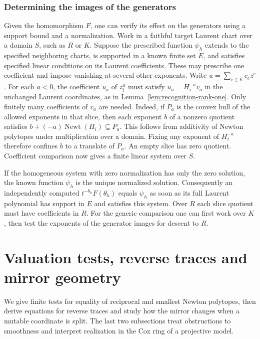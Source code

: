 \documentclass[11pt,reqno]{amsart}
\numberwithin{equation}{section}
\theoremstyle{definition}
\theoremstyle{remark}
\DeclareMathOperator{\Newt}{Newt}
\begin{document}
\subsubsection{Determining the images of the generators}\label{subsec:hilbert-chart-test}

Given the homomorphism \(F\), one can verify its effect on the
generators using a support bound and a normalization. Work in a
faithful target Laurent chart over a domain \(S\), such as \(R\) or \(K\). Suppose the prescribed
function \(\psi_h\) extends to the specified neighboring charts, is
supported in a known finite set \(E\), and satisfies specified linear
conditions on its Laurent coefficients. These may prescribe one
coefficient and impose vanishing at several other exponents.
Write \(u=\sum_{e\in E}c_ez^e\).
For each \(a<0\), the coefficient \(u_a\) of \(z_i^a\) must satisfy
\(u_a=H_i^{-a}v_a\) in the unchanged Laurent coordinates, as in
Lemma~\ref{lem:recognition-rank-one}. Only finitely many coefficients
of \(v_a\) are needed. Indeed, if \(P_a\) is the convex hull of the
allowed exponents in that slice, then each exponent \(b\) of a
nonzero quotient satisfies
\(b+(-a)\Newt (H_i)\subseteq P_a\).
This follows from additivity of Newton polytopes under multiplication
over a domain. Fixing any exponent of \(H_i^{-a}\) therefore confines \(b\) to a
translate of \(P_a\). An empty slice has zero quotient. Coefficient
comparison now gives a finite linear system over \(S\).

If the homogeneous system with zero normalization has only the zero
solution, the known function \(\psi_h\) is the unique normalized
solution. Consequently an independently computed
\(t^{-b_h}F(\theta_h)\) equals \(\psi_h\) as soon as its full Laurent
polynomial has support in \(E\) and satisfies this system. Over \(R\) each slice quotient must have coefficients in \(R\).
For the generic comparison one can first work over \(K\), then test
the exponents of the generator images for descent to \(R\).

\section{Valuation tests, reverse traces and mirror geometry}\label{app:sections}

We give finite tests for equality of reciprocal and smallest Newton
polytopes, then derive equations for reverse traces and study how the
mirror changes when a mutable coordinate is split. The last two
subsections treat obstructions to smoothness and interpret realization
in the Cox ring of a projective model.
\end{document}
